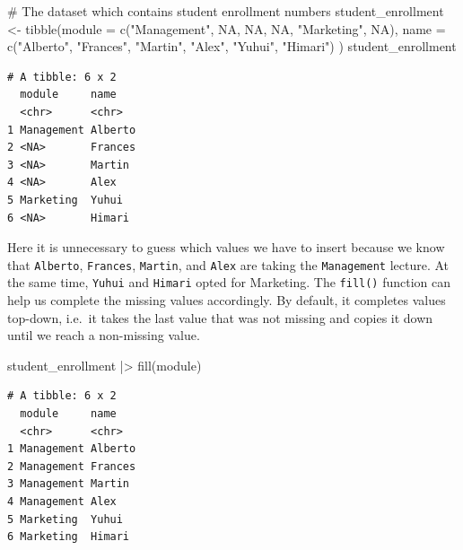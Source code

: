 \documentclass[
  letterpaper,
  DIV=11,
  numbers=noendperiod]{scrreprt}
\newenvironment{Shaded}{\begin{snugshade}}{\end{snugshade}}
\newcommand{\AttributeTok}[1]{\textcolor[rgb]{0.40,0.45,0.13}{#1}}
\newcommand{\CommentTok}[1]{\textcolor[rgb]{0.37,0.37,0.37}{#1}}
\newcommand{\ConstantTok}[1]{\textcolor[rgb]{0.56,0.35,0.01}{#1}}
\newcommand{\FunctionTok}[1]{\textcolor[rgb]{0.28,0.35,0.67}{#1}}
\newcommand{\NormalTok}[1]{\textcolor[rgb]{0.00,0.23,0.31}{#1}}
\newcommand{\OtherTok}[1]{\textcolor[rgb]{0.00,0.23,0.31}{#1}}
\newcommand{\SpecialCharTok}[1]{\textcolor[rgb]{0.37,0.37,0.37}{#1}}
\newcommand{\StringTok}[1]{\textcolor[rgb]{0.13,0.47,0.30}{#1}}
\begin{document}
\begin{Shaded}
\begin{Highlighting}[]
\CommentTok{\# The dataset which contains student enrollment numbers}
\NormalTok{student\_enrollment }\OtherTok{\textless{}{-}} \FunctionTok{tibble}\NormalTok{(}\AttributeTok{module =} \FunctionTok{c}\NormalTok{(}\StringTok{"Management"}\NormalTok{, }\ConstantTok{NA}\NormalTok{, }\ConstantTok{NA}\NormalTok{,}
                                        \ConstantTok{NA}\NormalTok{, }\StringTok{"Marketing"}\NormalTok{, }\ConstantTok{NA}\NormalTok{),}
                             \AttributeTok{name =} \FunctionTok{c}\NormalTok{(}\StringTok{"Alberto"}\NormalTok{, }\StringTok{"Frances"}\NormalTok{, }\StringTok{"Martin"}\NormalTok{,}
                                    \StringTok{"Alex"}\NormalTok{, }\StringTok{"Yuhui"}\NormalTok{, }\StringTok{"Himari"}\NormalTok{)}
\NormalTok{                             )}
\NormalTok{student\_enrollment}
\end{Highlighting}
\end{Shaded}

\begin{verbatim}
# A tibble: 6 x 2
  module     name   
  <chr>      <chr>  
1 Management Alberto
2 <NA>       Frances
3 <NA>       Martin 
4 <NA>       Alex   
5 Marketing  Yuhui  
6 <NA>       Himari 
\end{verbatim}

Here it is unnecessary to guess which values we have to insert because
we know that \texttt{Alberto}, \texttt{Frances}, \texttt{Martin}, and
\texttt{Alex} are taking the \texttt{Management} lecture. At the same
time, \texttt{Yuhui} and \texttt{Himari} opted for Marketing. The
\texttt{fill()} function can help us complete the missing values
accordingly. By default, it completes values top-down, i.e.~it takes the
last value that was not missing and copies it down until we reach a
non-missing value.

\begin{Shaded}
\begin{Highlighting}[]
\NormalTok{student\_enrollment }\SpecialCharTok{|\textgreater{}} \FunctionTok{fill}\NormalTok{(module)}
\end{Highlighting}
\end{Shaded}

\begin{verbatim}
# A tibble: 6 x 2
  module     name   
  <chr>      <chr>  
1 Management Alberto
2 Management Frances
3 Management Martin 
4 Management Alex   
5 Marketing  Yuhui  
6 Marketing  Himari 
\end{verbatim}
\end{document}
